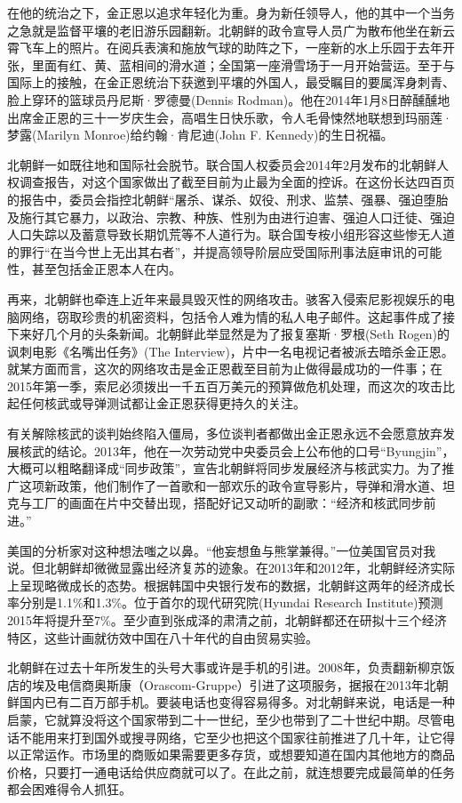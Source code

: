 在他的统治之下，金正恩以追求年轻化为重。身为新任领导人，他的其中一个当务之急就是监督平壤的老旧游乐园翻新。北朝鲜的政令宣导人员广为散布他坐在新云霄飞车上的照片。在阅兵表演和施放气球的助阵之下，一座新的水上乐园于去年开张，里面有红、黄、蓝相间的滑水道；全国第一座滑雪场于一月开始营运。至于与国际上的接触，在金正恩统治下获邀到平壤的外国人，最受瞩目的要属浑身刺青、脸上穿环的篮球员丹尼斯·罗德曼(Dennis Rodman)。他在2014年1月8日醉醺醺地出席金正恩的三十一岁庆生会，高唱生日快乐歌，令人毛骨悚然地联想到玛丽莲·梦露(Marilyn Monroe)给约翰·肯尼迪(John F. Kennedy)的生日祝福。

北朝鲜一如既往地和国际社会脱节。联合国人权委员会2014年2月发布的北朝鲜人权调查报告，对这个国家做出了截至目前为止最为全面的控诉。在这份长达四百页的报告中，委员会指控北朝鲜“屠杀、谋杀、奴役、刑求、监禁、强暴、强迫堕胎及施行其它暴力，以政治、宗教、种族、性别为由进行迫害、强迫人口迁徒、强迫人口失踪以及蓄意导致长期饥荒等不人道行为。联合国专桉小组形容这些惨无人道的罪行“在当今世上无出其右者”，并提高领导阶层应受国际刑事法庭审讯的可能性，甚至包括金正恩本人在内。

再来，北朝鲜也牵连上近年来最具毁灭性的网络攻击。骇客入侵索尼影视娱乐的电脑网络，窃取珍贵的机密资料，包括令人难为情的私人电子邮件。这起事件成了接下来好几个月的头条新闻。北朝鲜此举显然是为了报复塞斯·罗根(Seth Rogen)的讽刺电影《名嘴出任务》(The Interview)，片中一名电视记者被派去暗杀金正恩。就某方面而言，这次的网络攻击是金正恩截至目前为止做得最成功的一件事；在2015年第一季，索尼必须拨出一千五百万美元的预算做危机处理，而这次的攻击比起任何核武或导弹测试都让金正恩获得更持久的关注。

有关解除核武的谈判始终陷入僵局，多位谈判者都做出金正恩永远不会愿意放弃发展核武的结论。2013年，他在一次劳动党中央委员会上公布他的口号“Byungjin”，大概可以粗略翻译成“同步政策”，宣告北朝鲜将同步发展经济与核武实力。为了推广这项新政策，他们制作了一首歌和一部欢乐的政令宣导影片，导弹和滑水道、坦克与工厂的画面在片中交替出现，搭配好记又动听的副歌：“经济和核武同步前进。”

美国的分析家对这种想法嗤之以鼻。“他妄想鱼与熊掌兼得。”一位美国官员对我说。但北朝鲜却微微显露出经济复苏的迹象。在2013年和2012年，北朝鲜经济实际上呈现略微成长的态势。根据韩国中央银行发布的数据，北朝鲜这两年的经济成长率分别是1.1\%和1.3\%。位于首尔的现代研究院(Hyundai Research Institute)预测2015年将提升至7\%。至少直到张成泽的肃清之前，北朝鲜都还在研拟十三个经济特区，这些计画就彷效中国在八十年代的自由贸易实验。

北朝鲜在过去十年所发生的头号大事或许是手机的引进。2008年，负责翻新柳京饭店的埃及电信商奥斯康（Orascom-Gruppe）引进了这项服务，据报在2013年北朝鲜国内已有二百万部手机。要装电话也变得容易得多。对北朝鲜来说，电话是一种启蒙，它就算没将这个国家带到二十一世纪，至少也带到了二十世纪中期。尽管电话不能用来打到国外或搜寻网络，它至少也把这个国家往前推进了几十年，让它得以正常运作。市场里的商贩如果需要更多存货，或想要知道在国内其他地方的商品价格，只要打一通电话给供应商就可以了。在此之前，就连想要完成最简单的任务都会困难得令人抓狂。

